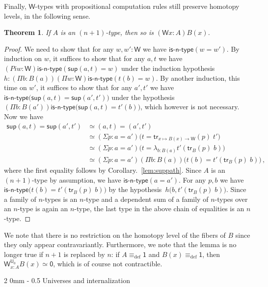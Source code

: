 \documentclass[reqno,10pt,a4paper,oneside]{amsart}
\makeatletter
\numberwithin{equation}{section}
\renewcommand{\subsection}{\@startsection
  {subsection}%
  {2}%
  {0mm}%
  {-\baselineskip}%
  {0.5\baselineskip}%
  {\normalfont\normalsize\bf}}%
\theoremstyle{mythm}
\newtheorem{theorem}{Theorem}[subsection]
\theoremstyle{mydef}
\theoremstyle{myrmk}
\newcommand{\deq}{\equiv}
\newcommand{\defeq}{\deq_{\mathrm{def}}}
\newcommand{\isntype}[1]{\mathsf{is}\text{-}\mathsf{#1}\text{-}\mathsf{type}}
\newcommand{\trans}{\mathsf{tr}}
\newcommand{\lam}[1]{\lambda_{#1}}
\newcommand{\W}{\mathsf{W}}
\newcommand{\wsup}{\mathsf{sup}}
\newcommand{\one}{\mathsf{1}}
\newcommand{\zero}{\mathsf{0}}
\newcommand{\UU}{\mathsf{U}}
\makeatother
\begin{document}
Finally, $\W$-types with propositional computation rules still preserve homotopy levels, in the following sense.

\begin{theorem}
If $A$ is an $(n+1)$-type, then so is $(\W x:A)B(x)$.
\end{theorem}


\begin{proof}
We need to show that for any $w, w' : \W$ we have $\isntype{n}(w = w')$. By induction on $w$, it suffices to show that for any $a,t$ we have $(Pi w:\W) \isntype{n}(\wsup(a,t) = w)$ under the induction hypothesis $h : (\Pi b:B(a)) (\Pi w:\W) \isntype{n}(t(b) = w)$.  By another induction, this time on $w'$, it suffices to show that for any $a',t'$ we have
$\isntype{n}\big(\wsup(a,t) = \wsup(a',t')\big)$ under the hypothesis $(\Pi b:B(a')) \isntype{n}\big(\wsup(a,t) = t'(b)\big)$, which however is not necessary. Now we have
\begin{align*} 
\wsup(a,t) = \wsup(a',t') 
& \simeq (a,t) = (a',t') \\
& \simeq (\Sigma p : a = a') \big(t = \trans_{x \mapsto B(x) \to \W}(p) \; t'\big) \\
& \simeq  (\Sigma p : a = a')  \big(t = \lam{b:B(a)} t'(\trans_B(p) \; b)\big) \\
& \simeq (\Sigma p : a = a') (\Pi b:B(a)) \big(t(b) = t'(\trans_B(p) \; b)\big) \, , 
\end{align*}
where the first equality follows by Corollary.~\ref{lem:suppath}. Since $A$ is an $(n+1)$-type by assumption, we have $\isntype{n}(a=a')$. For any $p,b$ we have $\isntype{n}\big(t(b) = t'(\trans_B(p) \; b)\big)$ by the hypothesis~$h\big(b,t'(\trans_B(p) \; b)\big)$. Since a family of $n$-types is an $n$-type and a dependent sum of a family of $n$-types over an $n$-type is again an $n$-type, the last type in the above chain of equalities is an $n$-type. 
\end{proof}

We note that there is no restriction on the homotopy level of the fibers of $B$ since they only appear contravariantly. Furthermore, we note that the lemma is no longer true if $n+1$ is replaced by $n$: if $A \defeq \one$ and $B(x) \defeq \one$, then $\W^{\UU_0}_{x:A} B(x) \simeq \zero$, which is of course not contractible. 



\subsection{Universes and internalization}
\end{document}

